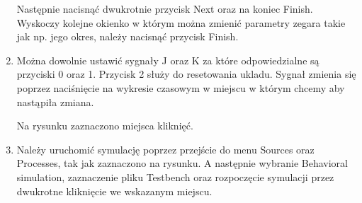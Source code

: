 \documentclass{article}
\begin{document}
\begin{enumerate}
\begin{minipage}[t]{\linewidth}
          \medskip
Następnie nacisnąć dwukrotnie przycisk Next oraz na koniec Finish. Wyskoczy kolejne okienko w którym można zmienić parametry zegara takie jak np. jego okres, należy nacisnąć przycisk Finish.
 \end{minipage}
\item Można dowolnie ustawić sygnały J oraz K za które odpowiedzialne są przyciski 0 oraz 1. Przycisk 2 służy do resetowania ukladu. Sygnał zmienia się poprzez naciśnięcie na wykresie czasowym w miejscu w którym chcemy aby nastąpiła zmiana.\\ \begin{minipage}[t]{\linewidth}
          \raggedright

          \medskip
Na rysunku zaznaczono miejsca kliknięć.
 \end{minipage}
\item Należy uruchomić symulację poprzez przejście do menu Sources oraz Processes, tak jak zaznaczono na rysunku. A następnie wybranie Behavioral simulation, zaznaczenie pliku Testbench oraz rozpoczęcie symulacji przez dwukrotne kliknięcie we wskazanym miejscu.\\ \begin{minipage}[t]{\linewidth}
          \raggedright


\end{minipage}
\end{enumerate}
\end{document}

